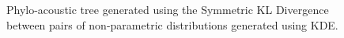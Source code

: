 \documentclass[pdftex,11pt,a4paper]{article}
\theoremstyle{definition}
\theoremstyle{remark}
\begin{document}
\begin{figure}
\noindent{}
    \caption{Phylo-acoustic tree generated using the Symmetric KL Divergence between pairs of non-parametric distributions generated using KDE.}
    \label{fig:kdeskld}
\end{figure}
\end{document}
